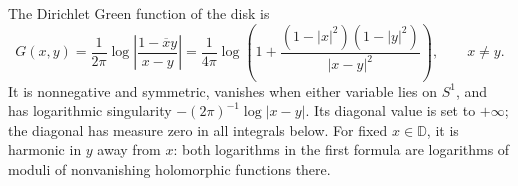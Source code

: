 The Dirichlet Green function of the disk is
\begin{equation}\label{eq:disk-green}
 G(x,y)=\frac1{2\pi}\log\left|
                  \frac{1-\overline{x}y}{x-y}\right|
 =\frac1{4\pi}\log\left(
       1+\frac{(1-|x|^2)(1-|y|^2)}{|x-y|^2}\right),
 \qquad x\ne y.
\end{equation}
It is nonnegative and symmetric, vanishes when either variable lies
on $S^1$, and has logarithmic singularity
$-(2\pi)^{-1}\log|x-y|$. Its diagonal value is set to $+\infty$;
the diagonal has measure zero in all integrals below.
For fixed $x\in\mathbb D$, it is harmonic in $y$ away from $x$:
both logarithms in the first formula are logarithms of moduli of
nonvanishing holomorphic functions there.

